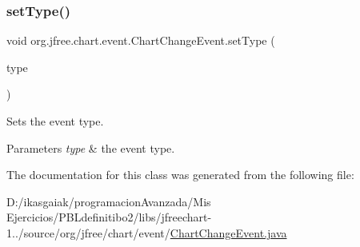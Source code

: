 \subsubsection{\texorpdfstring{set\+Type()}{setType()}}
{\footnotesize\ttfamily void org.\+jfree.\+chart.\+event.\+Chart\+Change\+Event.\+set\+Type (\begin{DoxyParamCaption}\item[{\mbox{\hyperlink{classorg_1_1jfree_1_1chart_1_1event_1_1_chart_change_event_type}{Chart\+Change\+Event\+Type}}}]{type }\end{DoxyParamCaption})}

Sets the event type.


\begin{DoxyParams}{Parameters}
{\em type} & the event type. \\
\hline
\end{DoxyParams}


The documentation for this class was generated from the following file\+:\begin{DoxyCompactItemize}
\item 
D\+:/ikasgaiak/programacion\+Avanzada/\+Mis Ejercicios/\+P\+B\+Ldefinitibo2/libs/jfreechart-\/1../source/org/jfree/chart/event/\mbox{\hyperlink{_chart_change_event_8java}{Chart\+Change\+Event.\+java}}\end{DoxyCompactItemize}
